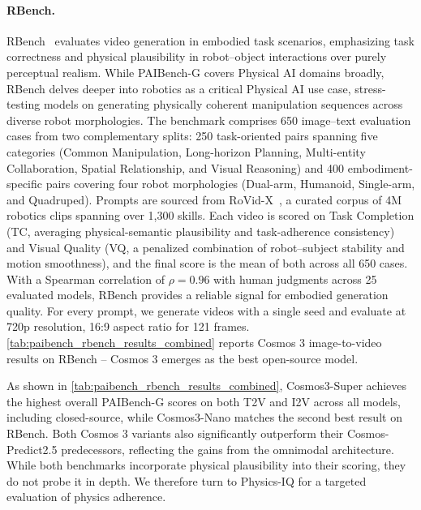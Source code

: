 \paragraph{RBench.} RBench~\citep{deng2026rbench} evaluates video generation in embodied task scenarios, emphasizing task correctness and physical plausibility in robot–object interactions over purely perceptual realism. While PAIBench-G covers Physical AI domains broadly, RBench delves deeper into robotics as a critical Physical AI use case, stress-testing models on generating physically coherent manipulation sequences across diverse robot morphologies. The benchmark comprises 650 image–text evaluation cases from two complementary splits: 250 task-oriented pairs spanning five categories (Common Manipulation, Long-horizon Planning, Multi-entity Collaboration, Spatial Relationship, and Visual Reasoning) and 400 embodiment-specific pairs covering four robot morphologies (Dual-arm, Humanoid, Single-arm, and Quadruped). Prompts are sourced from RoVid-X~\citep{deng2026rbench}, a curated corpus of 4M robotics clips spanning over 1,300 skills. Each video is scored on Task Completion (TC, averaging physical-semantic plausibility and task-adherence consistency) and Visual Quality (VQ, a penalized combination of robot–subject stability and motion smoothness), and the final score is the mean of both across all 650 cases. With a Spearman correlation of $\rho = 0.96$ with human judgments across 25 evaluated models, RBench provides a reliable signal for embodied generation quality. For every prompt, we generate videos with a single seed and evaluate at 720p resolution, 16:9 aspect ratio for 121 frames. \cref{tab:paibench_rbench_results_combined} reports Cosmos 3 image-to-video results on RBench -- Cosmos 3 emerges as the best open-source model.

As shown in \cref{tab:paibench_rbench_results_combined}, Cosmos3-Super achieves the highest overall PAIBench-G scores on both T2V and I2V across all models, including closed-source, while Cosmos3-Nano matches the second best result on RBench. Both Cosmos 3 variants also significantly outperform their Cosmos-Predict2.5 predecessors, reflecting the gains from the omnimodal architecture. While both benchmarks incorporate physical plausibility into their scoring, they do not probe it in depth. We therefore turn to Physics-IQ for a targeted evaluation of physics adherence.

